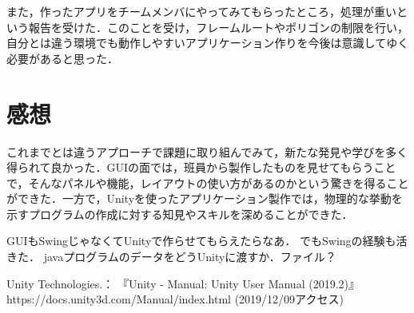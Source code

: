 \documentclass[12pt]{jarticle}
\begin{document}
また，作ったアプリをチームメンバにやってみてもらったところ，処理が重いという報告を受けた．このことを受け，フレームルートやポリゴンの制限を行い，自分とは違う環境でも動作しやすいアプリケーション作りを今後は意識してゆく必要があると思った．

\section{感想}
これまでとは違うアプローチで課題に取り組んでみて，新たな発見や学びを多く得られて良かった．GUIの面では，班員から製作したものを見せてもらうことで，そんなパネルや機能，レイアウトの使い方があるのかという驚きを得ることができた．一方で，Unityを使ったアプリケーション製作では，物理的な挙動を示すプログラムの作成に対する知見やスキルを深めることができた．


GUIもSwingじゃなくてUnityで作らせてもらえたらなあ．
でもSwingの経験も活きた．
javaプログラムのデータをどうUnityに渡すか．ファイル？


\begin{thebibliography}{99}
Unity Technologies.： 『Unity - Manual: Unity User Manual (2019.2)』 https://docs.unity3d.com/Manual/index.html (2019/12/09アクセス) \\
\end{thebibliography}
\end{document}
